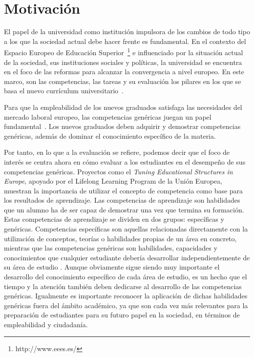 


\section{Motivación}
\label{sec:Motivation}

El papel de la universidad como institución impulsora de los cambios de todo tipo a los que la sociedad actual debe hacer frente es fundamental. En el contexto del Espacio Europeo de Educación Superior~\footnote{http://www.eees.es/} e influenciado por la situación actual de  la sociedad, sus instituciones sociales y políticas, la universidad se encuentra en el foco de las reformas para alcanzar la convergencia a nivel europeo. En este marco, son las competencias, las tareas y su evaluación los pilares en los que se basa el nuevo currículum universitario~\cite{zabala2005espacio}.

Para que la empleabilidad de los nuevos graduados satisfaga las necesidades del mercado laboral europeo, las competencias genéricas juegan un papel fundamental~\cite{communique2012making}. Los nuevos graduados deben adquirir y demostrar competencias genéricas, además de dominar el conocimiento específico de la materia.

Por tanto, en lo que a la evaluación se refiere, podemos decir que el foco de interés se centra ahora en cómo evaluar a los estudiantes en el desempeño de sus competencias genéricas. Proyectos como el \emph{Tuning Educational Structures in Europe}, apoyado por el Lifelong Learning Program de la Unión Europea, muestran la importancia de utilizar el concepto de competencia como base para los resultados de aprendizaje. Las competencias de aprendizaje son habilidades que un alumno ha de ser capaz de demostrar una vez que termina su formación. Estas competencias de aprendizaje se dividen en dos grupos: específicas y genéricas. Competencias específicas son aquellas relacionadas directamente con la utilización de conceptos, teorías o habilidades propias de un área en concreto, mientras que las competencias genéricas son habilidades, capacidades y conocimientos que cualquier estudiante debería desarrollar independientemente de su área de estudio \cite{gonzalez2003tuning}. Aunque obviamente sigue siendo muy importante el desarrollo del conocimiento específico de cada área de estudio, es un hecho que el tiempo y la atención también deben dedicarse al desarrollo de las competencias genéricas. Igualmente es importante reconocer la aplicación de dichas habilidades genéricas fuera del ámbito académico, ya que son cada vez más relevantes para la preparación de estudiantes para su futuro papel en la sociedad, en términos de empleabilidad y ciudadanía.

